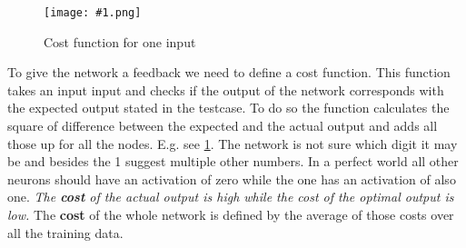 \documentclass{article}
\newcommand{\img}[1]{
	\centering
	\texttt{[image: \#1.png]}
	\label{#1}
}
\begin{document}
\begin{figure}[!htbp]
\img{ai_13}
\caption{Cost function for one input}
\end{figure}

To give the network a feedback we need to define a cost function. This function takes an input input and checks if the output of the network corresponds with the expected output stated in the testcase. To do so the function calculates the square of difference between the expected and the actual output and adds all those up for all the nodes. E.g. see \ref{ai_13}. The network is not sure which digit it may be and besides the 1 suggest multiple other numbers. In a perfect world all other neurons should have an activation of zero while the one has an activation of also one. \textit{The \textbf{cost} of the actual output is high while the cost of the optimal output is low.} The \textbf{cost} of the whole network is defined by the average of those costs over all the training data.
\end{document}
